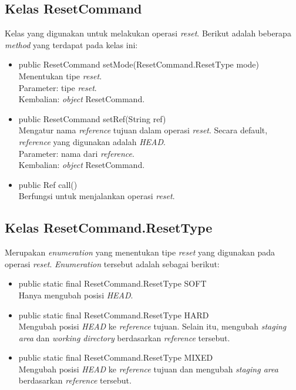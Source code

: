 \subsection{Kelas ResetCommand}
\label{subsec:resetcommand}
Kelas yang digunakan untuk melakukan operasi \textit{reset}.
Berikut adalah beberapa \textit{method} yang terdapat pada kelas ini:
\begin{itemize}
\item public ResetCommand setMode(ResetCommand.ResetType mode)\\
Menentukan tipe \textit{reset}.\\ 
Parameter: tipe \textit{reset}.\\
Kembalian: \textit{object} ResetCommand.
\item public ResetCommand setRef(String ref)\\
Mengatur nama \textit{reference} tujuan dalam operasi \textit{reset}. Secara default, \textit{reference} yang digunakan adalah \textit{HEAD}.\\
Parameter: nama dari \textit{reference}.\\
Kembalian: \textit{object} ResetCommand.
\item public Ref call()\\
Berfungsi untuk menjalankan operasi \textit{reset}.\\
\end{itemize}

\subsection{Kelas ResetCommand.ResetType}
\label{subsec:resettype}
Merupakan \textit{enumeration} yang menentukan tipe \textit{reset} yang digunakan pada operasi \textit{reset}.
\textit{Enumeration} tersebut adalah sebagai berikut:
\begin{itemize}
\item public static final ResetCommand.ResetType SOFT\\
Hanya mengubah posisi \textit{HEAD}. 
\item public static final ResetCommand.ResetType HARD\\
Mengubah posisi \textit{HEAD} ke \textit{reference} tujuan. Selain itu, mengubah \textit{staging area} dan \textit{working directory} berdasarkan \textit{reference} tersebut.
\item public static final ResetCommand.ResetType MIXED\\
Mengubah posisi \textit{HEAD} ke \textit{reference} tujuan dan mengubah \textit{staging area} berdasarkan \textit{reference} tersebut.
\end{itemize}

